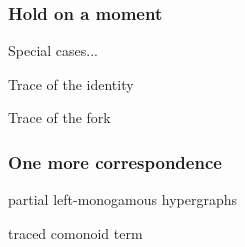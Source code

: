 \begin{frame}
    \frametitle{Hold on a moment}

    \centering
    \await
    \LARGE
    \alert{Special cases...}

    \Large
    \await
    \vspace{1em}

    \begin{minipage}{0.45\textwidth}
        \centering
        Trace of the identity

        \vspace{0.5em}

    \end{minipage}
    \quad
    \begin{minipage}{0.45\textwidth}
        \centering
        Trace of the fork

        \vspace{0.5em}

    \end{minipage}
\end{frame}
\begin{frame}
    \frametitle{One more correspondence}

    \centering

    \begin{minipage}{0.45\textwidth}
        \begin{center}
            partial left-monogamous hypergraphs
            \vspace{1em}

        \end{center}
    \end{minipage}
    \await
    \quad
    \raisebox{-1em}{\(\leftrightarrow\)}
    \begin{minipage}{0.45\textwidth}
        \begin{center}
            traced comonoid term

            \vspace{1em}

        \end{center}
    \end{minipage}

    \await
    \vspace{1.5em}

    \meanddan

\end{frame}
